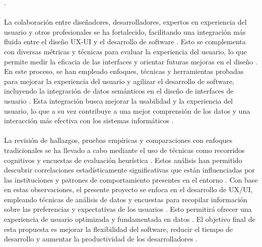 \documentclass[12pt,a4paper]{article}
\begin{document}
\cite{Klock2017}
\cite{Hassan2017}
.
\\\\
La colaboración entre diseñadores, desarrolladores, expertos en experiencia del usuario y otros profesionales se ha fortalecido, facilitando una integración más fluida entre el diseño UX-UI y el desarrollo de software
\cite{Duftschmid2010}
\cite{Allones2013}
\cite{Mørup2012}
. Esto se complementa con diversas métricas y técnicas para evaluar la experiencia del usuario, lo que permite medir la eficacia de las interfaces y orientar futuras mejoras en el diseño
\cite{Gouvas2016}
\cite{Gopu2016}
\cite{Cosenz2017}
. En este proceso, se han empleado enfoques, técnicas y herramientas probadas para mejorar la experiencia del usuario y agilizar el desarrollo de software, incluyendo la integración de datos semánticos en el diseño de interfaces de usuario
\cite{Guo2015}
\cite{Vaclav2017}
. Esta integración busca mejorar la usabilidad y la experiencia del usuario, lo que a su vez contribuye a una mejor comprensión de los datos y una interacción más efectiva con los sistemas informáticos
\cite{Marco-Ruiz2015}
\cite{JansenBosch}
.
\\\\
La revisión de hallazgos, pruebas empíricas y comparaciones con enfoques tradicionales se ha llevado a cabo mediante el uso de técnicas como recorridos cognitivos y encuestas de evaluación heurística
\cite{Hassan2016813}
\cite{Batini1992}
. Estos análisis han permitido descubrir correlaciones estadísticamente significativas que están influenciadas por las instituciones y patrones de comportamiento presentes en el entorno
\cite{Esposito201610}
\cite{Ferreira2017}
\cite{Feras2022}
. Con base en estas observaciones, el presente proyecto se enfoca en el desarrollo de UX/UI, empleando técnicas de análisis de datos y encuestas para recopilar información sobre las preferencias y expectativas de los usuarios
\cite{Stacey2017}
\cite{Upadhyay2023}
\cite{Zhao2008}
. Esto permitirá ofrecer una experiencia de usuario optimizada y fundamentada en datos
\cite{Gibbs2015}
\cite{Catalina2008}
. El objetivo final de esta propuesta es mejorar la flexibilidad del software, reducir el tiempo de desarrollo y aumentar la productividad de los desarrolladores
\cite{Moner2018}
\cite{Alomari2020}
.
\end{document}

